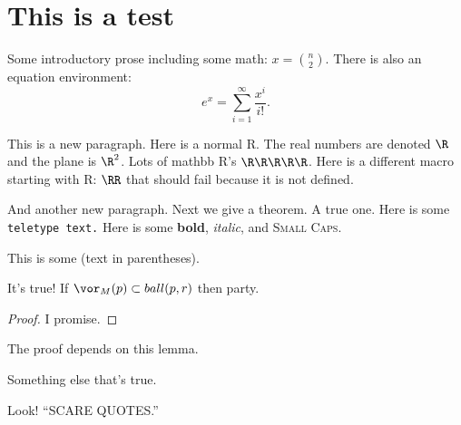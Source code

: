 \section{This is a test} %
\label{sec:this_is_a_test}

Some introductory prose including some math: $x = {n \choose 2}$.
There is also an equation environment:
\[
  e^x = \sum_{i=1}^\infty \frac{x^i}{i!}.
\]

This is a new paragraph. Here is a normal R.
The real numbers are denoted $\R$ and the plane is $\R^2$. Lots of mathbb R's $\R\R\R\R\R$.
Here is a different macro starting with R: $\RR$ that should fail because it is not defined.

And another new paragraph.
Next we give a theorem.  A true one.
Here is some \texttt{teletype text.}
Here is some \textbf{bold}, \emph{italic}, and \textsc{Small Caps}.

This is some (text in parentheses).

  \begin{theorem}\label{thm:true_theorem}
    It's true!  If $\vor_M(p) \subset ball(p,r)$ then party.
  \end{theorem}
  \begin{proof}
    I promise.
  \end{proof}

  The proof depends on this lemma.
  
  \begin{lemma}\label{lem:necessary}
    Something else that's true.
  \end{lemma}

  Look! ``SCARE QUOTES.''



